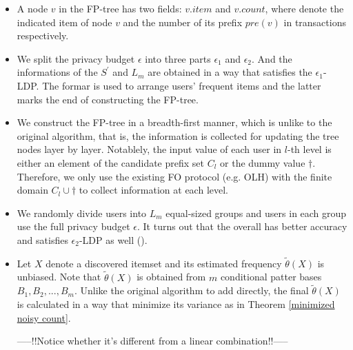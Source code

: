 \documentclass[conference]{IEEEtran}
\begin{document}
\begin{itemize}
\item A node $v$ in the FP-tree has two fields: $v.item$ and $v.count$, where denote the indicated item of node $v$ and the number of its prefix $pre(v)$ in transactions respectively.
\item We split the privacy budget $\epsilon$ into three parts $\epsilon_1$ and $\epsilon_2$. And the informations of the $S^{\prime}$ and $L_m$ are obtained in a way that satisfies the $\epsilon_1$-LDP. The formar is used to arrange users' frequent items and the latter marks the end of constructing the FP-tree.
\item We construct the FP-tree in a breadth-first manner, which is unlike to the original algorithm, that is, the information is collected for updating the tree nodes layer by layer. Notablely, the input value of each user in $l$-th level is either an element of the candidate prefix set $C_l$ or the dummy value $\dagger$. Therefore, we only use the existing FO protocol (e.g. OLH) with the finite domain $C_l \cup \dagger$ to collect information at each level.
\item We randomly divide users into $L_m$ equal-sized groups and users in each group use the full privacy budget $\epsilon$. It turns out that the overall has better accuracy and satisfies $\epsilon_2$-LDP as well (\cite{a8,privtrie}).
\item {\color{red} Let $X$ denote a discovered itemset and its estimated frequency $\tilde {\theta}(X)$ is unbiased. Note that $\tilde {\theta}(X)$ is obtained from $m$ conditional patter bases $B_1,B_2,...,B_m$. Unlike the original algorithm to add directly, the final $\tilde {\theta}(X)$ is calculated in a way that minimize its variance as in Theorem \ref{minimized noisy count}. 






-----!!Notice whether it's different from a linear combination!!-----}

\end{itemize}
\end{document}
